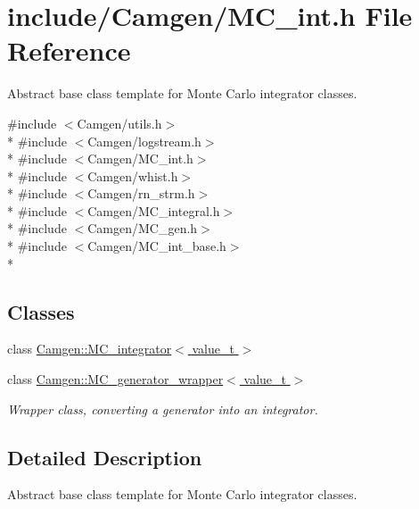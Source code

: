 \hypertarget{a00692}{}\section{include/\+Camgen/\+M\+C\+\_\+int.h File Reference}
\label{a00692}


Abstract base class template for Monte Carlo integrator classes.  


{\ttfamily \#include $<$Camgen/utils.\+h$>$}\\*
{\ttfamily \#include $<$Camgen/logstream.\+h$>$}\\*
{\ttfamily \#include $<$Camgen/\+M\+C\+\_\+int.\+h$>$}\\*
{\ttfamily \#include $<$Camgen/whist.\+h$>$}\\*
{\ttfamily \#include $<$Camgen/rn\+\_\+strm.\+h$>$}\\*
{\ttfamily \#include $<$Camgen/\+M\+C\+\_\+integral.\+h$>$}\\*
{\ttfamily \#include $<$Camgen/\+M\+C\+\_\+gen.\+h$>$}\\*
{\ttfamily \#include $<$Camgen/\+M\+C\+\_\+int\+\_\+base.\+h$>$}\\*
\subsection*{Classes}
\begin{DoxyCompactItemize}
\item 
class \hyperlink{a00369}{Camgen\+::\+M\+C\+\_\+integrator$<$ value\+\_\+t $>$}
\item 
class \hyperlink{a00367}{Camgen\+::\+M\+C\+\_\+generator\+\_\+wrapper$<$ value\+\_\+t $>$}
\begin{DoxyCompactList}\small\item\em Wrapper class, converting a generator into an integrator. \end{DoxyCompactList}\end{DoxyCompactItemize}


\subsection{Detailed Description}
Abstract base class template for Monte Carlo integrator classes. 

